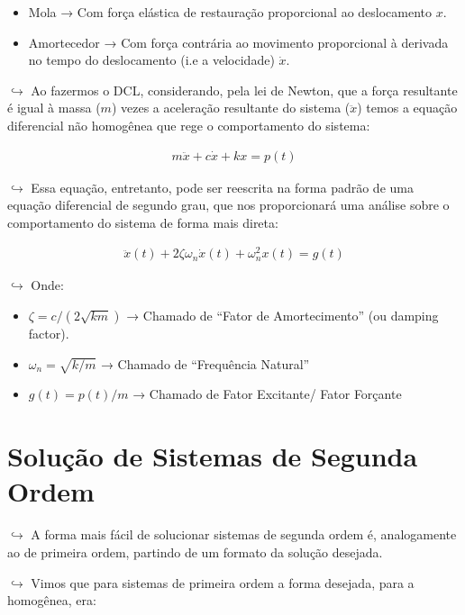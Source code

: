 \documentclass{article}
\begin{document}
\begin{itemize}
\begin{itemize}
\tightlist
\item
  Mola → Com força elástica de restauração proporcional ao deslocamento
  \(x\).
\item
  Amortecedor → Com força contrária ao movimento proporcional à derivada
  no tempo do deslocamento (i.e a velocidade) \(\dot x\).
\end{itemize}

\(\hookrightarrow\) Ao fazermos o DCL, considerando, pela lei de Newton,
que a força resultante é igual à massa (\(m\)) vezes a aceleração
resultante do sistema (\(\ddot x\)) temos a equação diferencial não
homogênea que rege o comportamento do sistema:

\[
\begin{align}
m\ddot x + c\dot x + kx = p(t)
\end{align}
\]

\(\hookrightarrow\) Essa equação, entretanto, pode ser reescrita na
forma padrão de uma equação diferencial de segundo grau, que nos
proporcionará uma análise sobre o comportamento do sistema de forma mais
direta:

\[
\begin{align}
\ddot x(t) + 2\zeta \omega _n\dot x(t) + \omega^2_nx(t) = g(t)
\end{align}
\]

\(\hookrightarrow\) Onde:

\begin{itemize}
\tightlist
\item
  \(\zeta = c/(2\sqrt{ km})\) → Chamado de ``Fator de Amortecimento''
  (ou damping factor).
\item
  \(\omega_n = \sqrt{k/m}\) → Chamado de ``Frequência Natural''
\item
  \(g(t) = p(t) /m\) → Chamado de Fator Excitante/ Fator Forçante
\end{itemize}

\hypertarget{soluuxe7uxe3o-de-sistemas-de-segunda-ordem}{%
\section{Solução de Sistemas de Segunda
Ordem}\label{soluuxe7uxe3o-de-sistemas-de-segunda-ordem}}

\(\hookrightarrow\) A forma mais fácil de solucionar sistemas de segunda
ordem é, analogamente ao de primeira ordem, partindo de um formato da
solução desejada.

\(\hookrightarrow\) Vimos que para sistemas de primeira ordem a forma
desejada, para a homogênea, era:


\end{itemize}
\end{document}
